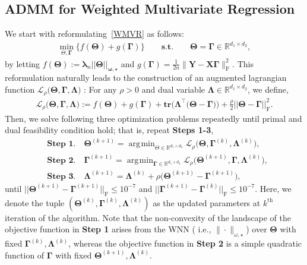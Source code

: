 \documentclass[alpha-refs]{wiley-article}
\DeclareMathOperator*{\argmin}{\arg\!\min}
\begin{document}
\subsection{ADMM for Weighted Multivariate Regression} \label{WMVR-ADMM}
We start with reformulating~\eqref{WMVR} as follows:
\begin{align} \label{reform}
    \min_{\Theta, \boldsymbol{\Gamma}} \bigg\{ f(\boldsymbol{\Theta}) + g(\boldsymbol{\Gamma}) \bigg\}
    \qquad \textbf{s.t.} \qquad \boldsymbol{\Theta} = \boldsymbol{\Gamma} \in \mathbb{R}^{d_{1}\times d_{2}},
\end{align}
by letting $f(\boldsymbol{\Theta}):=\boldsymbol{\lambda}_{n}||\boldsymbol{\Theta}||_{\boldsymbol{\omega,\star}}$ and $g(\boldsymbol{\Gamma})=\frac{1}{2n}\|\boldsymbol{Y}-\boldsymbol{X}\boldsymbol{\Gamma}\|_{\text{F}}^{2}$.
This reformulation naturally leads to the construction of an augmented lagrangian function $\mathcal{L}_{\rho}\big(\boldsymbol{\Theta},\boldsymbol{\Gamma},\boldsymbol{\Lambda}\big)$ : For any $\rho>0$ and dual variable $\boldsymbol{\Lambda} \in \mathbb{R}^{d_{1}\times d_{2}}$, we define, 
\begin{align} \label{Lagrangian}
    \mathcal{L}_{\rho}\big(\boldsymbol{\Theta},\boldsymbol{\Gamma},\boldsymbol{\Lambda}\big):=
    f(\boldsymbol{\Theta}) + g(\boldsymbol{\Gamma}) + \textbf{tr}\big( \boldsymbol{\Lambda}^{\top}\big( \boldsymbol{\Theta}-\boldsymbol{\Gamma} \big)\big)
    + \frac{\rho}{2} || \boldsymbol{\Theta}-\boldsymbol{\Gamma} ||_{\text{F}}^{2}.
\end{align}
Then, we solve following three optimization problems repeatedly until primal and dual feasibility condition hold; that is, 
repeat \textbf{Steps 1-3},
\begin{align*}
    &\textbf{Step 1.} \quad \boldsymbol{\Theta}^{(k+1)} = \argmin_{\Theta \in \mathbb{R}^{d_{1} \times d_{2}}} \mathcal{L}_{\rho} \big( \boldsymbol{\Theta},\boldsymbol{\Gamma}^{(k)},\boldsymbol{\Lambda}^{(k)} \big), \\
    &\textbf{Step 2.} \quad \boldsymbol{\Gamma}^{(k+1)} = \argmin_{\boldsymbol{\Gamma} \in \mathbb{R}^{d_{1} \times d_{2}}} \mathcal{L}_{\rho} \big( \boldsymbol{\Theta}^{(k+1)},\boldsymbol{\Gamma},\boldsymbol{\Lambda}^{(k)} \big),  \\
    &\textbf{Step 3.} \quad \boldsymbol{\Lambda}^{(k+1)} = \boldsymbol{\Lambda}^{(k)} + \rho\big( \boldsymbol{\Theta}^{(k+1)}-\boldsymbol{\Gamma}^{(k+1)} \big),
\end{align*}
until $|| \boldsymbol{\Theta}^{(k+1)}-\boldsymbol{\Gamma}^{(k+1)} ||_{\text{F}}\leq 10^{-7}$ and $|| \boldsymbol{\Gamma}^{(k+1)}-\boldsymbol{\Gamma}^{(k)} ||_{\text{F}}\leq 10^{-7}$.
Here, we denote the tuple $(\boldsymbol{\Theta}^{(k)},\boldsymbol{\Gamma}^{(k)},\boldsymbol{\Lambda}^{(k)})$ as the updated parameters at $k^{\text{th}}$ iteration of the algorithm.
Note that the non-convexity of the landscape of the objective function in \textbf{Step 1} arises from the WNN  ( i.e., $\|\cdot\|_{\omega,\star}$) over $\boldsymbol{\Theta}$ with fixed $\boldsymbol{\Gamma}^{(k)},\boldsymbol{\Lambda}^{(k)}$, whereas the objective function in \textbf{Step 2} is a simple quadratic function of $\boldsymbol{\Gamma}$ with fixed $\boldsymbol{\Theta}^{(k+1)},\boldsymbol{\Lambda}^{(k)}$. 
\end{document}
